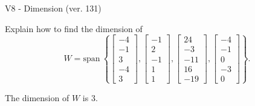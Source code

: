 \begin{exercise}
  \begin{exerciseTitle}V8 - Dimension (ver. 131)\end{exerciseTitle}
  \begin{exerciseStatement}
    Explain how to find the dimension of 
\[W=\mathrm{span}\ \left\{\left[\begin{array}{r}
-4 \\
-1 \\
3 \\
-4 \\
3
\end{array}\right] , \left[\begin{array}{r}
-1 \\
2 \\
-1 \\
1 \\
1
\end{array}\right] , \left[\begin{array}{r}
24 \\
-3 \\
-11 \\
16 \\
-19
\end{array}\right] , \left[\begin{array}{r}
-4 \\
-1 \\
0 \\
-3 \\
0
\end{array}\right]\right\}.\]



  \end{exerciseStatement}
  \begin{exerciseAnswer}
   The dimension of \(W\) is  \(3\).
  


  \end{exerciseAnswer}
\end{exercise}
